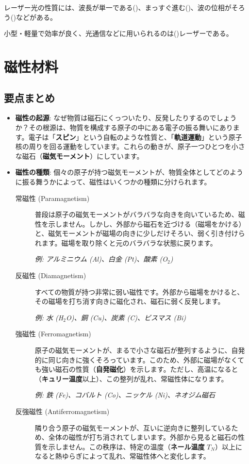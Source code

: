 \documentclass[11pt,a4paper]{ltjsarticle}
\newcommand{\blank}[1][3cm]{\underline{\hspace{#1}}}
\begin{document}
レーザー光の性質には、波長が単一である(\blank[2cm])、まっすぐ進む(\blank[2cm])、波の位相がそろう(\blank[2.5cm])などがある。

小型・軽量で効率が良く、光通信などに用いられるのは(\blank[2.5cm])レーザーである。

\section{磁性材料}
\subsection{要点まとめ}
\begin{itemize}
    \item \textbf{磁性の起源}: なぜ物質は磁石にくっついたり、反発したりするのでしょうか？その根源は、物質を構成する原子の中にある電子の振る舞いにあります。電子は「\textbf{スピン}」という自転のような性質と、「\textbf{軌道運動}」という原子核の周りを回る運動をしています。これらの動きが、原子一つひとつを小さな磁石（\textbf{磁気モーメント}）にしています。
    \item \textbf{磁性の種類}: 個々の原子が持つ磁気モーメントが、物質全体としてどのように振る舞うかによって、磁性はいくつかの種類に分けられます。
        \begin{description}
            \item[常磁性 (Paramagnetism)]
            普段は原子の磁気モーメントがバラバラな向きを向いているため、磁性を示しません。しかし、外部から磁石を近づける（磁場をかける）と、磁気モーメントが磁場の向きに少しだけそろい、弱く引き付けられます。磁場を取り除くと元のバラバラな状態に戻ります。

            \textit{例: アルミニウム (Al)、白金 (Pt)、酸素 (O$_2$)}
            \item[反磁性 (Diamagnetism)]
            すべての物質が持つ非常に弱い磁性です。外部から磁場をかけると、その磁場を打ち消す向きに磁化され、磁石に弱く反発します。

            \textit{例: 水 (H$_2$O)、銅 (Cu)、炭素 (C)、ビスマス (Bi)}
            \item[強磁性 (Ferromagnetism)]
            原子の磁気モーメントが、まるで小さな磁石が整列するように、自発的に同じ向きに強くそろっています。このため、外部に磁場がなくても強い磁石の性質（\textbf{自発磁化}）を示します。ただし、高温になると（\textbf{キュリー温度}以上）、この整列が乱れ、常磁性体になります。

            \textit{例: 鉄 (Fe)、コバルト (Co)、ニッケル (Ni)、ネオジム磁石}
            \item[反強磁性 (Antiferromagnetism)]
            隣り合う原子の磁気モーメントが、互いに逆向きに整列しているため、全体の磁性が打ち消されてしまいます。外部から見ると磁石の性質を示しません。この秩序は、特定の温度（\textbf{ネール温度} $T_N$）以上になると熱ゆらぎによって乱れ、常磁性体へと変化します。


\end{description}
\end{itemize}
\end{document}
